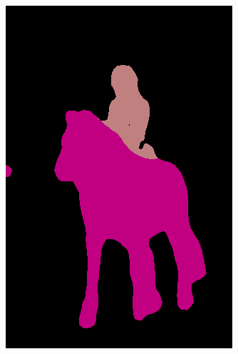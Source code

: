 \documentclass{article} %
\begin{document}
\begin{figure}[t]
\begin{subfigure}[b]{0.19\linewidth}
    \includegraphics[width=\textwidth]{figs/ab/fcn/2007_005331}
  \end{subfigure}
  \begin{subfigure}[b]{0.19\linewidth}

\end{subfigure}
\end{figure}
\end{document}
